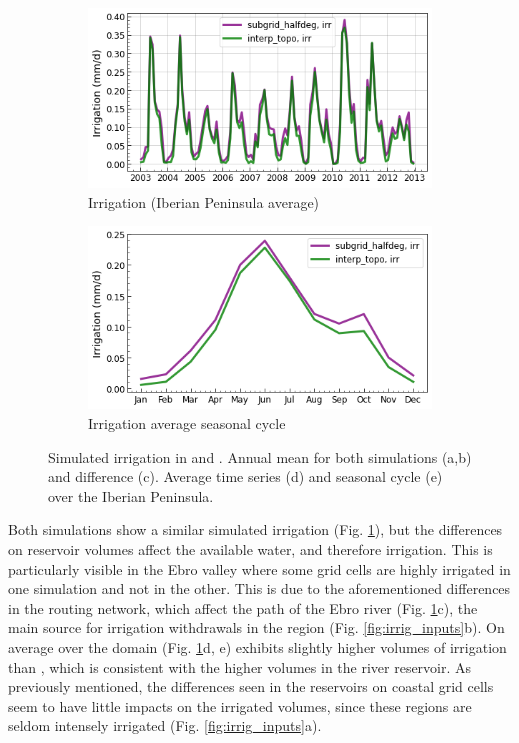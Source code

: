 \begin{figure}[htbp]
    \begin{subfigure}[b]{0.48\textwidth}
        \caption{Irrigation (Iberian Peninsula average)}
        \includegraphics[width=\textwidth]{images/chap3/time_series/irrigation_time_series.png}
    \end{subfigure}    
    \begin{subfigure}[b]{0.48\textwidth}
        \caption{Irrigation average seasonal cycle}
        \includegraphics[width=\textwidth]{images/chap3/time_series/irrigation_seasonal_cycle.png}
    \end{subfigure}

    \caption{Simulated irrigation in \std and \native. Annual mean for both simulations (a,b) and difference (c). Average time series (d) and seasonal cycle (e) over the Iberian Peninsula.}
    \label{fig:irrigation_halfdeg_eval}
\end{figure}

Both simulations show a similar simulated irrigation (Fig. \ref{fig:irrigation_halfdeg_eval}), but the differences on reservoir volumes affect the available water, and therefore irrigation. This is particularly visible in the Ebro valley where some grid cells are highly irrigated in one simulation and not in the other. This is due to the aforementioned differences in the routing network, which affect the path of the Ebro river (Fig. \ref{fig:irrigation_halfdeg_eval}c), the main source for irrigation withdrawals in the region (Fig. \ref{fig:irrig_inputs}b).
On average over the domain (Fig. \ref{fig:irrigation_halfdeg_eval}d, e) \std exhibits slightly higher volumes of irrigation than \native, which is consistent with the higher volumes in the river reservoir. As previously mentioned, the differences seen in the reservoirs on coastal grid cells seem to have little impacts on the irrigated volumes, since these regions are seldom intensely irrigated (Fig. \ref{fig:irrig_inputs}a). 

